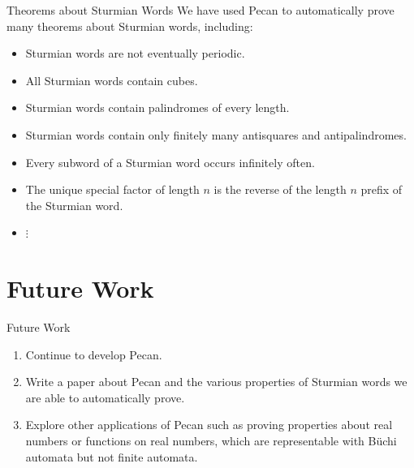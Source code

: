 \documentclass[leqno,presentation,usenames,dvipsnames]{beamer}
\begin{document}
\begin{frame}{Theorems about Sturmian Words}
    We have used Pecan to automatically prove many theorems about Sturmian words, including:
    \begin{itemize}
        \item Sturmian words are not eventually periodic.
        \item All Sturmian words contain cubes.
        \item Sturmian words contain palindromes of every length.
        \item Sturmian words contain only finitely many antisquares and antipalindromes.
        \item Every subword of a Sturmian word occurs infinitely often.
        \item The unique special factor of length $n$ is the reverse of the length $n$ prefix of the Sturmian word.
        \item $\vdots$
    \end{itemize}
\end{frame}

\section{Future Work}
\begin{frame}{Future Work}
    \begin{enumerate}
        \item Continue to develop Pecan.
        \item Write a paper about Pecan and the various properties of Sturmian words we are able to automatically prove.
        \item Explore other applications of Pecan such as proving properties about real numbers or functions on real numbers, which are representable with B\"uchi automata but not finite automata.
    \end{enumerate}
\end{frame}
\end{document}
